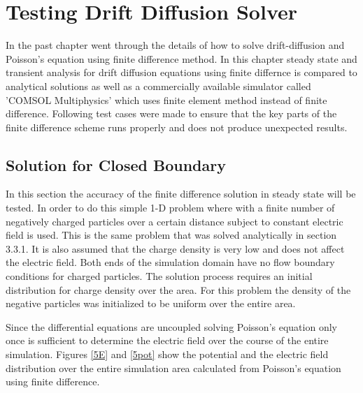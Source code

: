 
\chapter{Testing Drift Diffusion Solver} %

\label{Chapter4} %


In the past chapter went through the details of how to solve drift-diffusion and Poisson's equation using finite difference method. In this chapter steady state and transient analysis for drift diffusion equations using finite differnce is compared to analytical solutions as well as a commercially available simulator called 'COMSOL Multiphysics' which uses finite element method instead of finite difference. Following test cases were made to ensure that the key parts of the finite difference scheme runs properly and does not produce unexpected results. 

\section{Solution for Closed Boundary}
In this section the accuracy of the finite difference solution in steady state will be tested. In order to do this simple 1-D problem where with a finite number of negatively charged particles over a certain distance subject to constant electric field is used. This is the same problem that was solved analytically in section 3.3.1. It is also assumed that the charge density is very low and does not affect the electric field. Both ends of the simulation domain have no flow boundary conditions for charged particles. The solution process requires an initial distribution for charge density over the area. For this problem the density of the negative particles was initialized to be uniform over the entire area. 

Since the differential equations are uncoupled solving Poisson's equation only once is sufficient to determine the electric field over the course of the entire simulation. Figures \ref{5E} and \ref{5pot} show the potential and the electric field distribution over the entire simulation area calculated from Poisson's equation using finite difference. 

